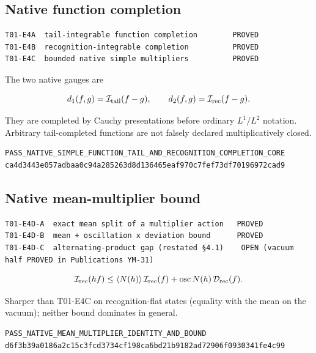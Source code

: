 \hypertarget{native-function-completion}{%
\subsection{Native function completion}\label{native-function-completion}}

\begin{verbatim}
T01-E4A  tail-integrable function completion        PROVED
T01-E4B  recognition-integrable completion          PROVED
T01-E4C  bounded native simple multipliers          PROVED
\end{verbatim}

The two native gauges are

\[
d_1(f,g)=\mathcal I_{\rm tail}(f-g),
\qquad
d_2(f,g)=\mathcal I_{\rm rec}(f-g).
\]

They are completed by Cauchy presentations before ordinary \(L^1/L^2\)
notation. Arbitrary tail-completed functions are not falsely declared
multiplicatively closed.

\begin{verbatim}
PASS_NATIVE_SIMPLE_FUNCTION_TAIL_AND_RECOGNITION_COMPLETION_CORE
ca4d3443e057adbaa0c94a285263d8d136465eaf970c7fef73df70196972cad9
\end{verbatim}

\hypertarget{native-mean-multiplier-bound}{%
\subsection{Native mean-multiplier bound}\label{native-mean-multiplier-bound}}

\begin{verbatim}
T01-E4D-A  exact mean split of a multiplier action   PROVED
T01-E4D-B  mean + oscillation x deviation bound      PROVED
T01-E4D-C  alternating-product gap (restated §4.1)    OPEN (vacuum half PROVED in Publications YM-31)
\end{verbatim}

\[
\mathcal I_{\rm rec}(hf)\le\langle N(h)\rangle\,\mathcal I_{\rm rec}(f)
+\operatorname{osc}N(h)\,\mathcal D_{\rm rec}(f).
\]

Sharper than T01-E4C on recognition-flat states (equality with the mean on
the vacuum); neither bound dominates in general.

\begin{verbatim}
PASS_NATIVE_MEAN_MULTIPLIER_IDENTITY_AND_BOUND
d6f3b39a0186a2c15c3fcd3734cf198ca6bd21b9182ad72906f0930341fe4c99
\end{verbatim}

